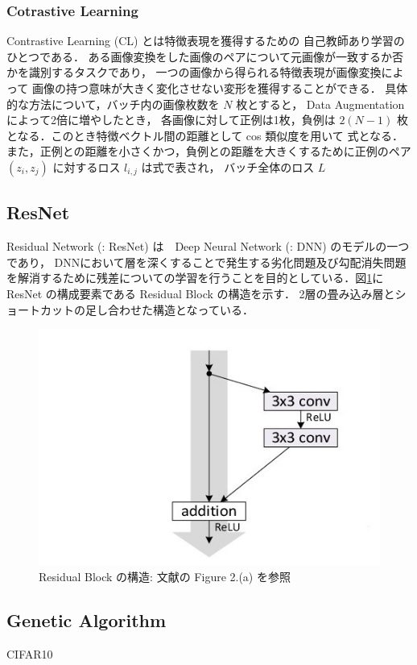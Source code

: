 \changeindent{0cm}
\subsubsection{Cotrastive Learning}
\changeindent{2cm}
Contrastive Learning (CL)\cite{tian2020makes} とは特徴表現を獲得するための
自己教師あり学習のひとつである．
ある画像変換をした画像のペアについて元画像が一致するか否かを識別するタスクであり，
一つの画像から得られる特徴表現が画像変換によって
画像の持つ意味が大きく変化させない変形を獲得することができる．
具体的な方法について，バッチ内の画像枚数を $N$ 枚とすると， Data Augmentation によって2倍に増やしたとき，
各画像に対して正例は1枚，負例は $2(N-1)$ 枚となる．このとき特徴ベクトル間の距離として cos 類似度を用いて
式となる．また，正例との距離を小さくかつ，負例との距離を大きくするために正例のペア $(z_i,z_j)$ に対するロス $l_{i,j}$ は式で表され，
バッチ全体のロス $L$ 


\changeindent{0cm}
\subsection{ResNet}
\changeindent{2cm}
Residual Network (: ResNet)\cite{he2016deep} は　Deep Neural Network (: DNN) のモデルの一つであり，
 DNNにおいて層を深くすることで発生する劣化問題及び勾配消失問題を解消するために残差についての学習を行うことを目的としている．図\ref{fig:ResBlock}に ResNet の構成要素である Residual Block の構造を示す．
2層の畳み込み層とショートカットの足し合わせた構造となっている．

\begin{figure}[h]
	\begin{center}
		\includegraphics[scale=0.5]{./images/ResBlock.jpg}
		\caption{Residual Block の構造: 文献\cite{he2016identity}の Figure 2.(a) を参照\label{fig:ResBlock}}
	\end{center}
\end{figure}

\changeindent{0cm}
\subsection{Genetic Algorithm}
\changeindent{2cm}
\cite{whitley1994genetic}


\cite{murata1996multi}



CIFAR10\cite{krizhevsky2009learning}
